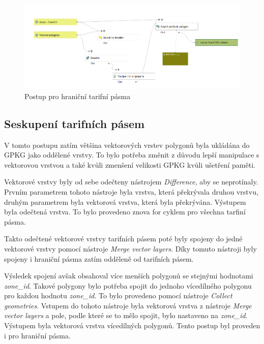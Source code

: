 \begin{figure}[H] \centering
    \includegraphics[width=400pt]{./pictures/postup-border-zones.png}
    \caption[Postup pro hraniční tarifní pásma]{Postup pro hraniční tarifní pásma}
	\label{fig:postup-border-zones}              
\end{figure}

\subsection{Seskupení tarifních pásem}

V tomto postupu zatím většina vektorových vrstev polygonů byla ukládána do GPKG jako oddělené vrstvy.
To bylo potřeba změnit z důvodu lepší manipulace s vektorovou vrstvou a také kvůli zmenšení velikosti GPKG
kvůli ušetření paměti.

Vektorové vrstvy byly od sebe odečteny nástrojem \textit{Difference}, aby se neprotínaly. 
Prvním parametrem tohoto nástroje byla vrstva, která překrývala druhou vrstvu, 
druhým parametrem byla vektorová vrstva, která byla překrývána. Výstupem byla odečtená vrstva.
To bylo provedeno znova for cyklem pro všechna tarfiní pásma.

Takto odečtené vektorové vrstvy tarifních pásem poté byly spojeny do jedné vektorové vrstvy pomocí 
nástroje \textit{Merge vector layers}. Díky tomuto nástroji byly spojeny i hraniční pásma zatím odděleně od tarifních pásem.

Výsledek spojení avšak obsahoval více menších polygonů se stejnými hodnotami \textit{zone\_id}.
Takové polygony bylo potřeba spojit do jednoho vícedílného polygonu pro každou hodnotu \textit{zone\_id}.
To bylo provedeno pomocí nástroje \textit{Collect geometries}. Vstupem do tohoto nástroje byla vektorová vrstva z 
nástroje \textit{Merge vector layers} a pole, podle které se to mělo spojit, bylo nastaveno na \textit{zone\_id}.
Výstupem byla vektorová vrstva vícedílných polygonů. Tento postup byl proveden i pro hraniční pásma.

